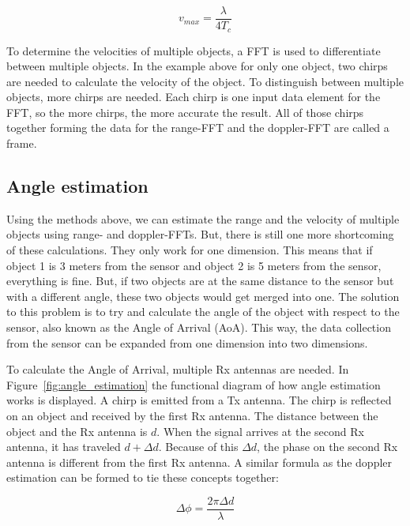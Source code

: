 \begin{equation}
v_{max} = \frac{\lambda}{4 T_c}
\label{eq:doppler_equation_max_speed}
\end{equation}

To determine the velocities of multiple objects, a FFT is used to differentiate between multiple objects. In the example above for only one object, two chirps are needed to calculate the velocity of the object. To distinguish between multiple objects, more chirps are needed. Each chirp is one input data element for the FFT, so the more chirps, the more accurate the result. All of those chirps together forming the data for the range-FFT and the doppler-FFT are called a frame. 

\subsection{Angle estimation}
\label{sec:angle_estimation}
Using the methods above, we can estimate the range and the velocity of multiple objects using range- and doppler-FFTs. But, there is still one more shortcoming of these calculations. They only work for one dimension. This means that if object 1 is 3 meters from the sensor and object 2 is 5 meters from the sensor, everything is fine. But, if two objects are at the same distance to the sensor but with a different angle, these two objects would get merged into one. The solution to this problem is to try and calculate the angle of the object with respect to the sensor, also known as the Angle of Arrival (AoA). This way, the data collection from the sensor can be expanded from one dimension into two dimensions.

To calculate the Angle of Arrival, multiple Rx antennas are needed. In Figure~\ref{fig:angle_estimation} the functional diagram of how angle estimation works is displayed. A chirp is emitted from a Tx antenna. The chirp is reflected on an object and received by the first Rx antenna. The distance between the object and the Rx antenna is $d$. When the signal arrives at the second Rx antenna, it has traveled $d + \Delta d$. Because of this $\Delta d$, the phase on the second Rx antenna is different from the first Rx antenna. A similar formula as the doppler estimation can be formed to tie these concepts together:

\begin{equation}
\Delta \phi = \frac{2 \pi \Delta d}{\lambda}
\label{eq:angle_equation}
\end{equation}

